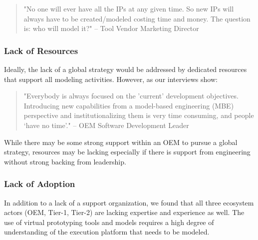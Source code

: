 \begin{quote}
"No one will ever have all the IPs at any given time. So new IPs will always have to be created/modeled costing time and money. The question is: who will model it?"
-- Tool Vendor Marketing Director
\end{quote}

\subsubsection*{Lack of Resources}
Ideally, the lack of a global strategy would be addressed by dedicated resources that support all modeling activities.
However, as  our interviews show:

\begin{quote}
"Everybody is always focused on the 'current' development objectives. Introducing new capabilities from a model-based engineering (MBE) perspective and institutionalizing them is very time consuming, and people ‘have no time’." 
-- OEM Software Development Leader
\end{quote}

While there may be some strong support within an OEM to pursue a global strategy, resources may be lacking especially if there is support from engineering without strong backing from leadership.

\subsubsection*{Lack of Adoption}
In addition to a lack of a support organization,
we found that all three ecosystem actors (OEM, Tier-1, Tier-2) are lacking expertise and experience as well.
The use of virtual prototyping tools and models requires a high degree of understanding of the execution platform that needs to be modeled.

